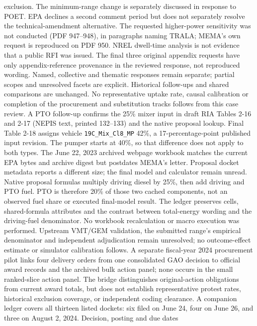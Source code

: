 exclusion. The minimum-range change is separately discussed in response to POET.
EPA declines a second comment period but does not separately resolve the
technical-amendment alternative. The requested higher-power sensitivity was
not conducted (PDF 947--948), in paragraphs naming TRALA; MEMA's own request
is reproduced on PDF 950. NREL dwell-time analysis is not evidence that a
public RFI was issued. The final three original appendix requests have only
appendix-reference provenance in the reviewed response, not reproduced wording.
Named, collective and thematic responses remain separate; partial scopes and
unresolved facets are explicit. Historical follow-ups and shared comparisons
are unchanged. No representative uptake rate, causal calibration or completion
of the procurement and substitution tracks follows from this case review.
A PTO follow-up confirms the 25\% mixer input in draft RIA Tables 2-16 and
2-17 (NEPIS text, printed 132--133) and the native proposal lookup. Final Table
2-18 assigns vehicle \texttt{19C\_Mix\_Cl8\_MP} 42\%, a 17-percentage-point
published input revision. The pumper starts at 40\%, so that difference does
not apply to both types. The June 22, 2023 archived webpage workbook matches
the current EPA bytes and archive digest but postdates MEMA's letter. Proposal
docket metadata reports a different size; the final model and calculator remain
unread. Native proposal formulas multiply driving diesel by 25\%, then add
driving and PTO fuel. PTO is therefore 20\% of those two cached components,
not an observed fuel share or executed final-model result. The ledger
 preserves
cells, shared-formula attributes and the contrast between total-energy wording
and the driving-fuel denominator. No workbook recalculation or macro execution
was performed. Upstream VMT/GEM validation, the submitted range's empirical
denominator and independent adjudication remain unresolved; no outcome-effect
estimate or simulator calibration follows.
A separate fiscal-year 2024 procurement
pilot links four delivery orders from one consolidated GAO decision to official
award records and the archived bulk action panel; none occurs in the small
ranked-slice action panel. The bridge distinguishes original-action obligations
from current award totals, but does not establish representative protest rates,
historical exclusion coverage, or independent coding clearance.
A companion ledger covers all thirteen listed dockets: six filed on June 24,
four on June 26, and three on August 2, 2024. Decision, posting and due dates
